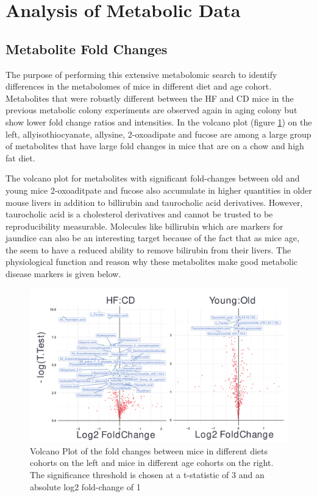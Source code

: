 \documentclass[a4paper]{book}
\begin{document}
	
	\section{Analysis of Metabolic Data}
	
	\subsection{Metabolite Fold Changes}
	
	The purpose of performing this extensive metabolomic search to identify differences in the metabolomes of mice in different diet and age cohort. Metabolites that were robustly different between the HF and CD mice in the previous metabolic colony experiments are observed again in aging colony but show lower fold change ratios and intensities. In the volcano plot (figure \ref{volcano: Meatbolite Fold Changes}) on the left, allyisothiocyanate, allysine, 2-oxoadipate and fucose are among a large group of metabolites that have large fold changes in mice that are on a chow and high fat diet. 
	
	The volcano plot for metabolites with significant fold-changes between old and young mice   2-oxoaditpate and fucose also accumulate in higher quantities in older mouse livers in addition to billirubin and taurocholic acid derivatives. However, taurocholic acid is a cholesterol derivatives and cannot be trusted to be reproducibility measurable. Molecules like billirubin which are markers for jaundice can also be an interesting target because of the fact that as mice age, the seem to have a reduced ability to remove bilirubin from their livers. The physiological function and reason why these metabolites make good metabolic disease markers is given below.
		
	
	\begin{figure}[t!]
		\centering
		\includegraphics[width=\linewidth]{3.Metabolomics/Volcano}
		\caption{Volcano Plot of the fold changes between mice in different diets cohorts on the left and mice in different age cohorts on the right. The significance threshold is chosen at a t-statistic of 3 and an absolute log2 fold-change of 1}
		\label{volcano: Meatbolite Fold Changes}
	\end{figure}
	
\end{document}
